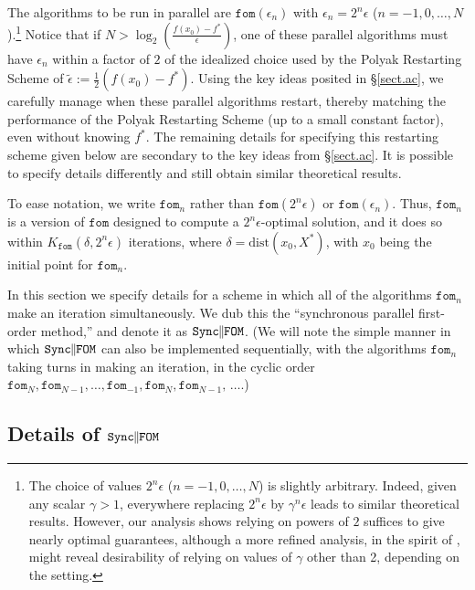 \documentclass[reqno, 11pt]{amsart}
\numberwithin{equation}{section}
\newcommand{\nt}{\negthinspace}
\newcommand{\fom}{\mathtt{fom}}
\newcommand{\parfom}{\parallel \nt \nt  \mathtt{FOM}}
\newcommand{\sparfom}{\mathtt{Sync} \nt \nt  \parfom}
\newcommand{\dist}{\mathrm{dist}}
\begin{document}
The algorithms to be run in parallel are $ \fom( \epsilon_n) $ with $ \epsilon_n = 2^n \epsilon $ ($ n = -1, 0, \ldots, N $).\footnote{The choice of values $ 2^n \epsilon $ ($ n = -1, 0, \ldots, N $) is slightly arbitrary. Indeed, given any scalar $ \gamma > 1 $, everywhere replacing $ 2^n \epsilon $ by $ \gamma^n \epsilon $ leads to similar theoretical results.  However, our analysis shows relying on powers of $ 2 $ suffices to give nearly optimal guarantees, although a more refined analysis, in the spirit of \cite{roulet2017sharpness}, might reveal desirability of relying on values of $ \gamma $ other than 2, depending on the setting.}
Notice that if $N>\log_2 ( \frac{f( x_0) - f^*}{ \epsilon} )$, one of these parallel algorithms must have $ \epsilon_n$ within a factor of $2$ of the idealized choice used by the Polyak Restarting Scheme of $\tilde{\epsilon} := \frac{1}{2}(f(x_0)-f^*)$. Using the key ideas posited in \S\ref{sect.ac}, we carefully manage when these parallel algorithms restart, thereby matching the performance of the Polyak Restarting Scheme (up to a small constant factor), even without knowing $f^*$. The remaining details for specifying this restarting scheme given below are secondary to the key ideas from \S\ref{sect.ac}. It is possible to specify details differently and still obtain similar theoretical results.

To ease notation, we write $ \fom_n $ rather than $ \fom(2^n \epsilon) $ or  $ \fom(\epsilon_n) $. Thus, $ \fom_n $ is a version of $ \fom $ designed to compute a $ 2^n \epsilon $-optimal solution, and it does so within $ K_{\fom}(\delta, 2^n \epsilon) $ iterations, where $ \delta = \dist(x_0, X^*) $, with $ x_0 $ being the initial point for $ \fom_n $. 

In this section we specify details for a scheme in which all of the algorithms $ \fom_n $ make an iteration simultaneously. We dub this the ``synchronous parallel first-order method,'' and denote it as $ \sparfom $. (We will note the simple manner in which $ \sparfom $ can also be implemented sequentially, with the algorithms $ \fom_n $ taking turns in making an iteration, in the cyclic order $ \fom_N, \fom_{N-1}, \ldots, \fom_{-1}, \fom_N, \fom_{N-1}, \,  \ldots $.)



\subsection{Details of $ \sparfom $} \label{sect.da} 
\end{document}
